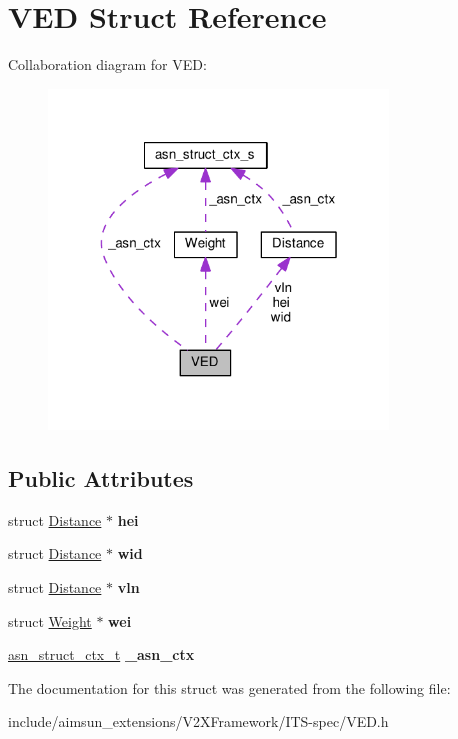 \hypertarget{structVED}{}\section{V\+ED Struct Reference}
\label{structVED}


Collaboration diagram for V\+ED\+:\nopagebreak
\begin{figure}[H]
\begin{center}
\leavevmode
\includegraphics[width=256pt]{structVED__coll__graph}
\end{center}
\end{figure}
\subsection*{Public Attributes}
\begin{DoxyCompactItemize}
\item 
struct \hyperlink{structDistance}{Distance} $\ast$ {\bfseries hei}\hypertarget{structVED_a52fdf5b83dce9df13fb5b6767695d4eb}{}\label{structVED_a52fdf5b83dce9df13fb5b6767695d4eb}

\item 
struct \hyperlink{structDistance}{Distance} $\ast$ {\bfseries wid}\hypertarget{structVED_a6bf1e25dfae99ce554039c2dc8461b38}{}\label{structVED_a6bf1e25dfae99ce554039c2dc8461b38}

\item 
struct \hyperlink{structDistance}{Distance} $\ast$ {\bfseries vln}\hypertarget{structVED_a9c87a5cdc92a40010ba79443b1f5c82f}{}\label{structVED_a9c87a5cdc92a40010ba79443b1f5c82f}

\item 
struct \hyperlink{structWeight}{Weight} $\ast$ {\bfseries wei}\hypertarget{structVED_a5501df78b77752f9952dd98fde86a2b9}{}\label{structVED_a5501df78b77752f9952dd98fde86a2b9}

\item 
\hyperlink{structasn__struct__ctx__s}{asn\+\_\+struct\+\_\+ctx\+\_\+t} {\bfseries \+\_\+asn\+\_\+ctx}\hypertarget{structVED_ad754ade57fbcb01ab02daa2c2e1a5ad6}{}\label{structVED_ad754ade57fbcb01ab02daa2c2e1a5ad6}

\end{DoxyCompactItemize}


The documentation for this struct was generated from the following file\+:\begin{DoxyCompactItemize}
\item 
include/aimsun\+\_\+extensions/\+V2\+X\+Framework/\+I\+T\+S-\/spec/V\+E\+D.\+h\end{DoxyCompactItemize}
